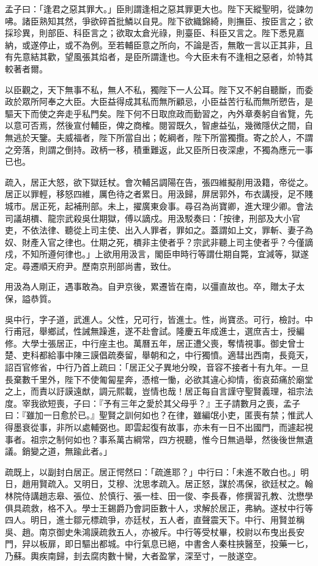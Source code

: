 \begin{pinyinscope}
孟子曰：「逢君之惡其罪大。」臣則謂逢相之惡其罪更大也。陛下天縱聖明，從諫勿咈。諸臣熟知其然，爭欲碎首批鱗以自見。陛下欲織錦綺，則撫臣、按臣言之；欲採珍異，則部臣、科臣言之；欲取太倉光祿，則臺臣、科臣又言之。陛下悉見嘉納，或遂停止，或不為例。至若輔臣意之所向，不論是否，無敢一言以正其非，且有先意結其歡，望風張其焰者，是臣所謂逢也。今大臣未有不逢相之惡者，炌特其較著者爾。

以臣觀之，天下無事不私，無人不私，獨陛下一人公耳。陛下又不躬自聽斷，而委政於眾所阿奉之大臣。大臣益得成其私而無所顧忌，小臣益苦行私而無所愬告，是驅天下而使之奔走乎私門矣。陛下何不日取庶政而勤習之，內外章奏躬自省覽，先以意可否焉，然後宣付輔臣，俾之商榷。閱習既久，智慮益弘，幾微隱伏之間，自無逃於天鑒。夫威福者，陛下所當自出；乾綱者，陛下所當獨攬。寄之於人，不謂之旁落，則謂之倒持。政柄一移，積重難返，此又臣所日夜深慮，不獨為應元一事已也。

疏入，居正大怒，欲下獄廷杖。會次輔呂調陽在告，張四維擬削用汲籍，帝從之。居正以罪輕，移怒四維，厲色待之者累日。用汲歸，屏居郭外，布衣講授，足不賤城市。居正死，起補刑部。未上，擢廣東僉事。尋召為尚寶卿，進大理少卿。會法司議胡檟、龍宗武殺吳仕期獄，傅以謫戍。用汲駁奏曰：「按律，刑部及大小官吏，不依法律、聽從上司主使、出入人罪者，罪如之。蓋謂如上文，罪斬、妻子為奴、財產入官之律也。仕期之死，檟非主使者乎？宗武非聽上司主使者乎？今僅謫戍，不知所遵何律也。」上欲用用汲言，閣臣申時行等謂仕期自斃，宜減等，獄遂定。尋遷順天府尹。歷南京刑部尚書，致仕。

用汲為人剛正，遇事敢為。自尹京後，累遷皆在南，以彊直故也。卒，贈太子太保，謚恭質。

吳中行，字子道，武進人。父性，兄可行，皆進士。性，尚寶丞。可行，檢討。中行甫冠，舉鄉試，性誡無躁進，遂不赴會試。隆慶五年成進士，選庶吉士，授編修。大學士張居正，中行座主也。萬曆五年，居正遭父喪，奪情視事。御史曾士楚、吏科都給事中陳三謨倡疏奏留，舉朝和之，中行獨憤。適彗出西南，長竟天，詔百官修省，中行乃首上疏曰：「居正父子異地分暌，音容不接者十有九年。一旦長棄數千里外，陛下不使匍匐星奔，憑棺一慟，必欲其違心抑情，銜哀茹痛於廟堂之上，而責以訏謨遠猷，調元熙載，豈情也哉！居正每自言謹守聖賢義理，祖宗法度。宰我欲短喪，子曰：『予有三年之愛於其父母乎？』王子請數月之喪，孟子曰：『雖加一日愈於已。』聖賢之訓何如也？在律，雖編氓小吏，匿喪有禁；惟武人得墨衰從事，非所以處輔弼也。即雲起復有故事，亦未有一日不出國門，而遽起視事者。祖宗之制何如也？事系萬古綱常，四方視聽，惟今日無過舉，然後後世無遺議。銷變之道，無踰此者。」

疏既上，以副封白居正。居正愕然曰：「疏進耶？」中行曰：「未進不敢白也。」明日，趙用賢疏入。又明日，艾穆、沈思孝疏入。居正怒，謀於馮保，欲廷杖之。翰林院侍講趙志皋、張位、於慎行、張一桂、田一俊、李長春，修撰習孔教、沈懋學俱具疏救，格不入。學士王錫爵乃會詞臣數十人，求解於居正，弗納。遂杖中行等四人。明日，進士鄒元標疏爭，亦廷杖，五人者，直聲震天下。中行、用賢並稱吳、趙。南京御史朱鴻謨疏救五人，亦被斥。中行等受杖畢，校尉以布曳出長安門，舁以板扉，即日驅出都城。中行氣息已絕，中書舍人秦柱挾醫至，投藥一匕，乃蘇。輿疾南歸，刲去腐肉數十臠，大者盈掌，深至寸，一肢遂空。


\end{pinyinscope}
